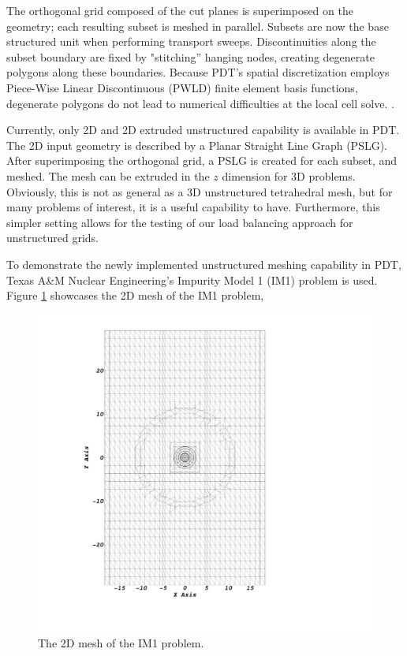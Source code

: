 \documentclass{anstrans}
\begin{document}
The orthogonal grid composed of the cut planes is superimposed on the geometry; each resulting subset is meshed in parallel.  Subsets are now the base structured unit when performing transport sweeps. Discontinuities along the subset boundary are fixed by "stitching'' hanging nodes, creating degenerate polygons along these boundaries. Because PDT's spatial discretization employs Piece-Wise Linear Discontinuous (PWLD) finite element basis functions, degenerate polygons do not lead to numerical difficulties at the local cell solve. \cite{pwld_teresa,pwld_ragusa}.

Currently, only 2D and 2D extruded unstructured capability is available in PDT. The 2D input geometry is described by a Planar Straight Line Graph (PSLG). After superimposing the orthogonal grid, a PSLG is created for each subset, and meshed. The mesh can be extruded in the $z$ dimension for 3D problems. Obviously, this is not as general as a 3D unstructured tetrahedral mesh, but for many problems of interest, it is a useful capability to have. Furthermore, this simpler setting allows for the testing of our load balancing approach for unstructured grids.

To demonstrate the newly implemented unstructured meshing capability in PDT, Texas A\&M Nuclear Engineering's Impurity Model 1 (IM1) problem is used. Figure \ref{IM12D} showcases the 2D mesh of the IM1 problem,

\begin{figure}[H]
\centering
\includegraphics[scale = 0.13, trim=28cm  4cm 0cm 4cm,clip]{figures/im12d.png}
\caption{The 2D mesh of the IM1 problem.}
\label{IM12D}
\end{figure}
\end{document}
